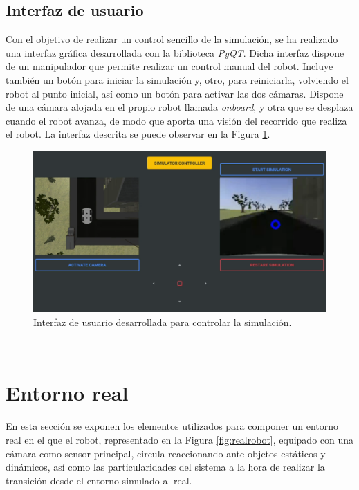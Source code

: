 \subsection{Interfaz de usuario}
\label{subsection:interface}
Con el objetivo de realizar un control sencillo de la simulación, se ha realizado una interfaz gráfica desarrollada con la biblioteca \textit{PyQT}. Dicha interfaz dispone de un manipulador que permite realizar un control manual del robot. Incluye también un botón para iniciar la simulación y, otro, para reiniciarla, volviendo el robot al punto inicial, así como un botón para activar las dos cámaras. Dispone de una cámara alojada en el propio robot llamada \textit{onboard}, y otra que se desplaza cuando el robot avanza, de modo que aporta una visión del recorrido que realiza el robot. La interfaz descrita se puede observar en la Figura \ref{fig:gui}.\\
\begin{figure} [h!]
	\begin{center}
		\includegraphics[width=12cm]{figs/GUI}
	\end{center}
	\caption{Interfaz de usuario desarrollada para controlar la simulación.}
	\label{fig:gui}
\end{figure}\

\section{Entorno real}
\label{section:real}
En esta sección se exponen los elementos utilizados para componer un entorno real en el que el robot, representado en la Figura \ref{fig:realrobot}, equipado con una cámara como sensor principal, circula reaccionando ante objetos estáticos y dinámicos, así como las particularidades del sistema a la hora de realizar la transición desde el entorno simulado al real.

